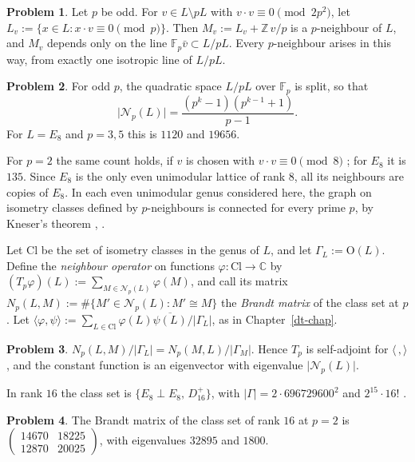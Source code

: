\documentclass[reqno]{amsart}
\newcounter{chap}
\theoremstyle{definition}
\newtheorem{problem}{Problem}[section]
\theoremstyle{plain}
\newcommand{\Z}{\mathbb{Z}}
\newcommand{\F}{\mathbb{F}}
\newcommand{\C}{\mathbb{C}}
\newcommand{\Cl}{\mathrm{Cl}}
\newcommand{\Nb}{\mathcal{N}}
\begin{document}
\begin{problem}\label{pr:nb-line}
Let \(p\) be odd.  For \(v \in L \setminus pL\) with \(v \cdot v \equiv 0 \pmod{2p^2}\), let \(L_v := \{x \in L : x \cdot v \equiv 0 \pmod p\}\).  Then \(M_v := L_v + \Z\, v/p\) is a \(p\)-neighbour of \(L\), and \(M_v\) depends only on the line \(\F_p \bar v \subset L/pL\).  Every \(p\)-neighbour arises in this way, from exactly one isotropic line of \(L/pL\).
\end{problem}

\begin{problem}\label{pr:nb-count}
For odd \(p\), the quadratic space \(L/pL\) over \(\F_p\) is split, so that
\[
  \lvert \Nb_p(L) \rvert = \frac{(p^k - 1)(p^{k-1} + 1)}{p - 1} .
\]
For \(L = E_8\) and \(p = 3, 5\) this is \(1120\) and \(19656\).
\end{problem}

For \(p = 2\) the same count holds, if \(v\) is chosen with \(v \cdot v \equiv 0 \pmod 8\) \cite{CL}; for \(E_8\) it is \(135\).  Since \(E_8\) is the only even unimodular lattice of rank \(8\), all its neighbours are copies of \(E_8\).  In each even unimodular genus considered here, the graph on isometry classes defined by \(p\)-neighbours is connected for every prime \(p\), by Kneser's theorem \cite{Kn}, \cite{CL}.

Let \(\Cl\) be the set of isometry classes in the genus of \(L\), and let \(\Gamma_L:=\mathrm{O}(L)\).  Define the \emph{neighbour operator} on functions \(\varphi \colon \Cl \to \C\) by \((T_p\varphi)(L) := \sum_{M \in \Nb_p(L)} \varphi(M)\), and call its matrix \(N_p(L, M) := \#\{M' \in \Nb_p(L) : M' \cong M\}\) the \emph{Brandt matrix} of the class set at \(p\).  Let \(\langle \varphi, \psi \rangle := \sum_{L \in \Cl} \varphi(L)\overline{\psi(L)}/\lvert\Gamma_L\rvert\), as in Chapter~\ref{dt-chap}.

\begin{problem}\label{pr:nb-adjoint}
\(N_p(L, M)/\lvert\Gamma_L\rvert = N_p(M, L)/\lvert\Gamma_M\rvert\).  Hence \(T_p\) is self-adjoint for \(\langle\,,\rangle\), and the constant function is an eigenvector with eigenvalue \(\lvert\Nb_p(L)\rvert\).
\end{problem}

In rank \(16\) the class set is \(\{E_8 \perp E_8,\, D_{16}^+\}\), with \(\lvert\Gamma\rvert = 2 \cdot 696729600^2\) and \(2^{15}\cdot 16!\) \cite{CoS}.

\begin{problem}\label{pr:rank16}
The Brandt matrix of the class set of rank \(16\) at \(p = 2\) is
\(\begin{pmatrix} 14670 & 18225 \\ 12870 & 20025 \end{pmatrix}\), with eigenvalues \(32895\) and \(1800\).
\end{problem}
\end{document}
